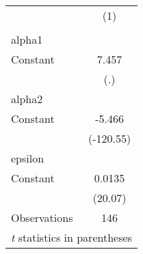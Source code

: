 \begin{tabular}{l*{1}{c}}
\hline\hline
                    &\multicolumn{1}{c}{(1)}\\
                    &\multicolumn{1}{c}{}\\
\hline
alpha1              &            \\
Constant            &       7.457\\
                    &         (.)\\
\hline
alpha2              &            \\
Constant            &      -5.466\\
                    &   (-120.55)\\
\hline
epsilon             &            \\
Constant            &      0.0135\\
                    &     (20.07)\\
\hline
Observations        &         146\\
\hline\hline
\multicolumn{2}{l}{\footnotesize \textit{t} statistics in parentheses}\\
\end{tabular}
